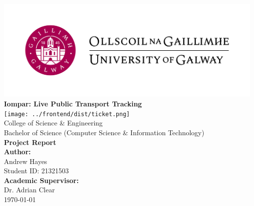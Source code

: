\documentclass[a4paper,11pt]{report}
\author{Andrew Hayes}
\begin{document}
\begin{titlepage}
    \begin{center}

        \vfill
        \includegraphics[width=\textwidth]{./images/Logo-UGalway-2-3166136658.jpg} \\[1cm]

        {\Huge \textbf{Iompar: Live Public Transport Tracking}} \\[0.5cm]
        
        \texttt{[image: ../frontend/dist/ticket.png]} \\[1cm]

        {\Large College of Science \& Engineering} \\[0.3cm]
        {\large Bachelor of Science (Computer Science \& Information Technology)} \\[0.5cm]

        {\large \textbf{Project Report}} \\[1.5cm]

        {\Large \textbf{Author:}} \\[0.2cm]
        {\large Andrew Hayes \\ Student ID: 21321503 } \\[1cm]

        {\Large \textbf{Academic Supervisor:}} \\[0.2cm]
        {\large Dr. Adrian Clear} \\[1.5cm]

        {\Large \today}
        \vfill
    \end{center}
\end{titlepage}
\end{document}
